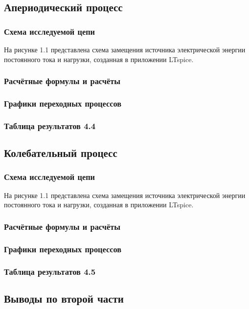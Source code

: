 \subsection{Апериодический процесс}

\subsubsection{Схема исследуемой цепи}
На рисунке 1.1 представлена схема замещения источника электрической энергии постоянного тока и нагрузки, созданная в приложении LTspice.


\subsubsection{Расчётные формулы и расчёты}

\subsubsection{Графики переходных процессов}

\subsubsection{Таблица результатов 4.4}

\subsection{Колебательный процесс}

\subsubsection{Схема исследуемой цепи}
На рисунке 1.1 представлена схема замещения источника электрической энергии постоянного тока и нагрузки, созданная в приложении LTspice.


\subsubsection{Расчётные формулы и расчёты}

\subsubsection{Графики переходных процессов}

\subsubsection{Таблица результатов 4.5}

\subsection{Выводы по второй части}
